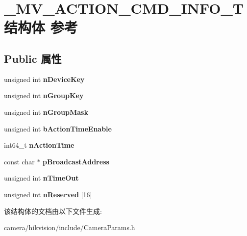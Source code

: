 \hypertarget{struct___m_v___a_c_t_i_o_n___c_m_d___i_n_f_o___t}{}\section{\+\_\+\+M\+V\+\_\+\+A\+C\+T\+I\+O\+N\+\_\+\+C\+M\+D\+\_\+\+I\+N\+F\+O\+\_\+\+T结构体 参考}
\label{struct___m_v___a_c_t_i_o_n___c_m_d___i_n_f_o___t}
\subsection*{Public 属性}
\begin{DoxyCompactItemize}
\item 
\mbox{\label{struct___m_v___a_c_t_i_o_n___c_m_d___i_n_f_o___t_a56b78a0d9f833e9b026262f1a4ca0573}} 
unsigned int {\bfseries n\+Device\+Key}
\item 
\mbox{\label{struct___m_v___a_c_t_i_o_n___c_m_d___i_n_f_o___t_ac1326d48d2a08b9fa7b0acdb1848e4d3}} 
unsigned int {\bfseries n\+Group\+Key}
\item 
\mbox{\label{struct___m_v___a_c_t_i_o_n___c_m_d___i_n_f_o___t_aaf4f9a18a741b2e52a0d9534c910a3f3}} 
unsigned int {\bfseries n\+Group\+Mask}
\item 
\mbox{\label{struct___m_v___a_c_t_i_o_n___c_m_d___i_n_f_o___t_a5436d62dc7bbde6efa7d5fcc277bbc87}} 
unsigned int {\bfseries b\+Action\+Time\+Enable}
\item 
\mbox{\label{struct___m_v___a_c_t_i_o_n___c_m_d___i_n_f_o___t_a034aba4700aa520331e2376881d7f125}} 
int64\+\_\+t {\bfseries n\+Action\+Time}
\item 
\mbox{\label{struct___m_v___a_c_t_i_o_n___c_m_d___i_n_f_o___t_a862eb9eaf344c81b2eba4d8366cae830}} 
const char $\ast$ {\bfseries p\+Broadcast\+Address}
\item 
\mbox{\label{struct___m_v___a_c_t_i_o_n___c_m_d___i_n_f_o___t_a43d2b5f52d87e60f88aa78fa68da87b2}} 
unsigned int {\bfseries n\+Time\+Out}
\item 
\mbox{\label{struct___m_v___a_c_t_i_o_n___c_m_d___i_n_f_o___t_a270780125fde281156fff848398be3a9}} 
unsigned int {\bfseries n\+Reserved} \mbox{[}16\mbox{]}
\end{DoxyCompactItemize}


该结构体的文档由以下文件生成\+:\begin{DoxyCompactItemize}
\item 
camera/hikvision/include/Camera\+Params.\+h\end{DoxyCompactItemize}

